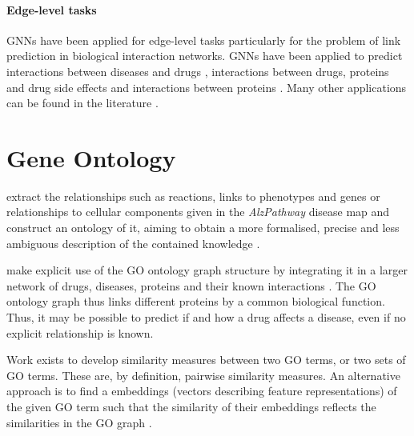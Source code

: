 \documentclass[
	fontsize=10pt, %
	twoside=true, %
	secnumdepth=1, %
  toc=indentunnumbered %
]{kaobook}
\begin{document}


\paragraph{Edge-level tasks} GNNs have been applied for edge-level tasks
particularly for the problem of link prediction in biological interaction
networks. GNNs have been applied to predict interactions between diseases and
drugs \cite{bajaj_GraphConvolutionalNetworks_2017}, interactions between drugs,
proteins and drug side effects \cite{zitnik_modeling_2018} and interactions
between proteins \cite{chereda_ExplainingDecisionsGraph_2021}. Many other
applications can be found in the literature
\cite{zhang_GraphNeuralNetworks_2021}.





\section{Gene Ontology}
\label{sec:gene-ontology-related}

\citeauthor{henry_ConvertingDiseaseMaps_2021} extract the relationships such as
reactions, links to phenotypes and genes or relationships to cellular components
given in the \textit{AlzPathway} disease map and construct an ontology of it,
aiming to obtain a more formalised, precise and less ambiguous description of
the contained knowledge \cite{henry_ConvertingDiseaseMaps_2021}.

\citeauthor{ruiz_identification_2021} make explicit use of the GO ontology graph
structure by integrating it in a larger network of drugs, diseases, proteins and
their known interactions \cite{ruiz_identification_2021}. The GO ontology graph
thus links different proteins by a common biological function. Thus, it may be
possible to predict if and how a drug affects a disease, even if no explicit
relationship is known.

Work exists to develop similarity measures between two GO terms, or two sets of
GO terms. \cite{zhao_GOGOImprovedAlgorithm_2018,
  yu_GOSemSimPackageMeasuring_2010, wang_NewMethodMeasure_2007} These are, by
definition, pairwise similarity measures. An alternative approach is to find a
embeddings (vectors describing feature representations) of the given GO term
such that the similarity of their embeddings reflects the similarities in the GO
graph \cite{zhong_GO2VecTransformingGO_2020}.
\end{document}
